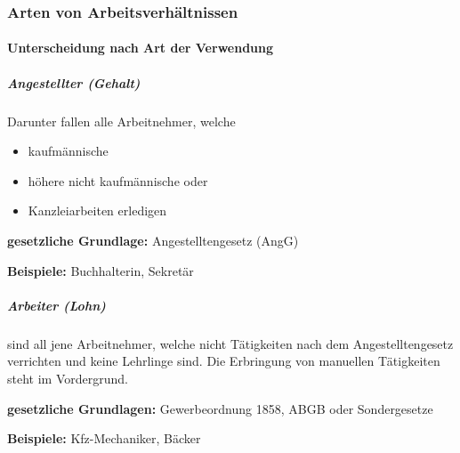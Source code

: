 \documentclass{htblagkr}
\begin{document}
    \subsubsection{Arten von Arbeitsverhältnissen}

    \paragraph{Unterscheidung nach Art der Verwendung}

    \subparagraph{Angestellter (Gehalt)}

    Darunter fallen alle Arbeitnehmer, welche

    \begin{itemize}
        \item{kaufmännische}
        \item{höhere nicht kaufmännische oder}
        \item{Kanzleiarbeiten erledigen}
    \end{itemize}

    \textbf{gesetzliche Grundlage:} Angestelltengesetz (AngG)

    \textbf{Beispiele:} Buchhalterin, Sekretär

    \subparagraph{Arbeiter (Lohn)}

    sind all jene Arbeitnehmer, welche nicht Tätigkeiten nach dem Angestelltengesetz verrichten und keine Lehrlinge sind.
    Die Erbringung von manuellen Tätigkeiten steht im Vordergrund.

    \textbf{gesetzliche Grundlagen:} Gewerbeordnung 1858, ABGB oder Sondergesetze

    \textbf{Beispiele:} Kfz-Mechaniker, Bäcker

    \clearpage

    \listoffigures
\end{document}
